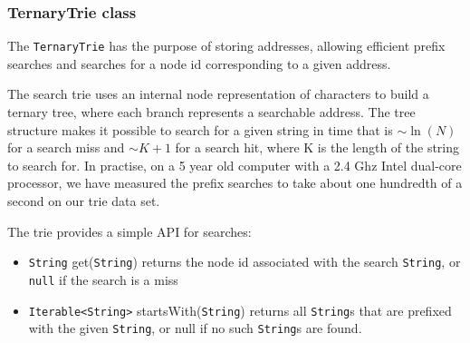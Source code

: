 \subsubsection{TernaryTrie class}
\label{sec:TernaryTrie class}
The \texttt{TernaryTrie} has the purpose of storing addresses, allowing efficient prefix searches and searches for a node id corresponding to a given address.

The search trie uses an internal node representation of characters to build a ternary tree, where each branch represents a searchable address.
The tree structure makes it possible to search for a given string in time that is $\sim\ln(N)$ for a search miss and  $\sim K+1$ for a search hit, where K is the length of the string to search for.
In practise, on a 5 year old computer with a 2.4 Ghz Intel dual-core processor, we have measured the prefix searches to take about one hundredth of a second on our trie data set.

The trie  provides a simple API for searches:
\begin{itemize}
	\item \texttt{String} get(\texttt{String}) returns the node id associated with the search \texttt{String}, or \texttt{null} if the search is a miss
	\item \texttt{Iterable<String>} startsWith(\texttt{String}) returns all \texttt{String}s that are prefixed with the given \texttt{String}, or null if no such \texttt{String}s are found.
\end{itemize}
